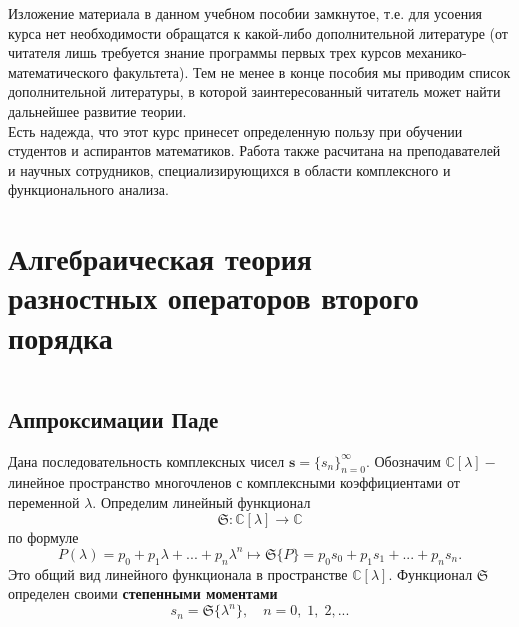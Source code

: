 \documentclass[12 pt, a4 paper]{article}
\theoremstyle{plain}   \newtheorem{Pro}{Задача}
\begin{document}
Изложение материала в данном учебном пособии замкнутое,
т.е. для усоения курса нет необходимости обращатся к какой-либо
дополнительной литературе (от читателя лишь требуется знание
программы первых трех курсов механико-математического факультета).
Тем не менее в конце пособия мы приводим список дополнительной
литературы, в которой заинтересованный читатель может найти дальнейшее
развитие теории. \\

Есть надежда, что этот курс принесет определенную пользу
при обучении студентов и аспирантов математиков.
Работа также расчитана на преподавателей и научных сотрудников,
специализирующихся в области комплексного и функционального
анализа.
\newpage
\section {Алгебраическая теория\\
разностных операторов второго порядка}
$ \; $
\\
$ \; $
\subsection{Аппроксимации Паде}
$ \; $
\\

Дана последовательность комплексных чисел
$ \mathbf{s}=\{s_n \}_{n=0}^{\infty}. $
Обозначим
$ \mathbb{C}[\lambda ] - $
линейное пространство многочленов с комплексными коэффициентами
от переменной
$ \lambda . $
Определим линейный функционал
$$
  \mathfrak{S} : \mathbb{C} [\lambda ]
  \longrightarrow \mathbb{C}
$$
по формуле
$$
  P(\lambda )=p_0 + p_1 \lambda +...+p_n \lambda ^n
  \mapsto \mathfrak{S} \{ P \} =
  p_0 s_0 + p_1 s_1 +...+p_n s_n .
$$
Это общий вид линейного функционала в пространстве
$ \mathbb{C}[\lambda ]. $
Функционал
$ \mathfrak{S} $
определен своими
{\bfseries степенными моментами}
$$
  s_n = \mathfrak{S} \{ \lambda ^n \} ,
  \quad n=0, \; 1, \; 2, ...
$$
\\
\end{document}

